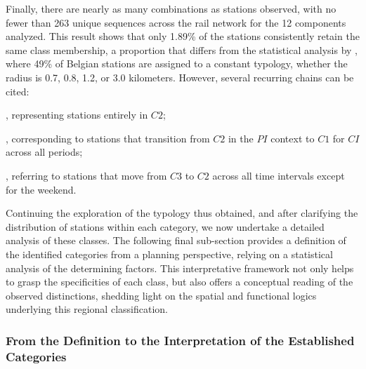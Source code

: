 \begin{refsegment}
Finally, there are nearly as many combinations as stations observed, with no fewer than 263 unique sequences across the rail network for the 12 components analyzed. This result shows that only 1.89\% of the stations consistently retain the same class membership, a proportion that differs from the statistical analysis by \textcolor{blue}{\textcite[518]{caset_measuring_2018}}, where 49\% of Belgian stations are assigned to a constant typology, whether the radius is 0.7, 0.8, 1.2, or 3.0 kilometers. However, several recurring chains can be cited:
\begin{customitemize}
    \item {}, representing stations entirely in \(C2\);
    \item {}, corresponding to stations that transition from \(C2\) in the \(PI\) context to \(C1\) for \(CI\) across all periods;
    \item {}, referring to stations that move from \(C3\) to \(C2\) across all time intervals except for the weekend.
\end{customitemize}%

Continuing the exploration of the typology thus obtained, and after clarifying the distribution of stations within each category, we now undertake a detailed analysis of these classes. The following final sub-section provides a definition of the identified categories from a planning perspective, relying on a statistical analysis of the determining factors. This interpretative framework not only helps to grasp the specificities of each class, but also offers a conceptual reading of the observed distinctions, shedding light on the spatial and functional logics underlying this regional classification.%

\subsubsection*{From the Definition to the Interpretation of the Established Categories
    \label{chap6:results-classification-gares-indicateurs}
    }


\end{refsegment}

